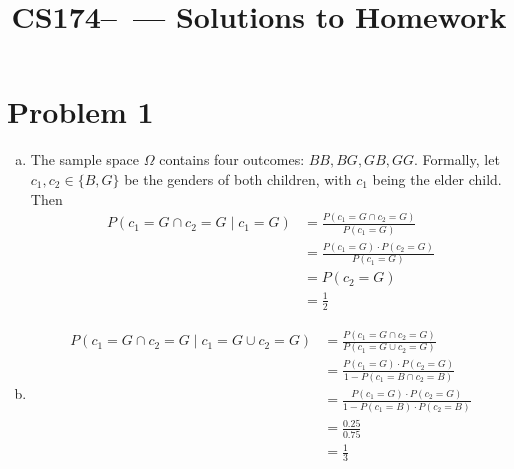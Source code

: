 \documentclass[11pt]{article}
\title{CS174--\Session\  --- Solutions to Homework \Homework}
\author{\Name}
\begin{document}
\maketitle
{}
\setcounter{problemnumber}{0}

\section*{Problem 1}
\begin{enumerate}[(a)]
\item The sample space $\Omega$ contains four outcomes: $BB,BG,GB,GG$. Formally, let $c_1, c_2 \in \{B,G\}$ be the genders of both children, with $c_1$ being the elder child. Then 
\begin{align*}
P(c_1=G\cap c_2=G\mid c_1=G) &= \frac{P(c_1=G\cap c_2=G)}{P(c_1=G)}\\
&= \frac{P(c_1=G)\cdot P(c_2=G)}{P(c_1=G)}\\
&= P(c_2=G)\\
&= \frac12
\end{align*}
\item 
\begin{align*}
P(c_1=G\cap c_2=G\mid c_1=G\cup c_2=G) &= \frac{P(c_1=G\cap c_2=G)}{P(c_1=G\cup c_2=G)}\\
&= \frac{P(c_1=G)\cdot P(c_2=G)}{1-P(c_1=B\cap c_2=B)}\\
&= \frac{P(c_1=G)\cdot P(c_2=G)}{1-P(c_1=B)\cdot P(c_2=B)}\\
&= \frac{0.25}{0.75}\\
&= \frac13
\end{align*}
\end{enumerate}


\newpage
\end{document}
